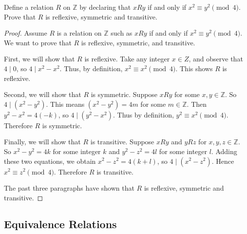 \documentclass[DIN, pagenumber=false, fontsize=11pt, parskip=half]{scrartcl}
\begin{document}
\begin{problems}
    \problem Define a relation $R$ on $\mathbb{Z}$ by declaring that $xRy$ if and only if $x^2 \equiv y^2 \pmod{4}$. Prove that $R$ is reflexive, symmetric and transitive.

    \answer 
    \begin{proof}
        Assume $R$ is a relation on $\mathbb{Z}$ such as $xRy$ if and only if $x^2 \equiv y^2 \pmod{4}$. We want to prove that $R$ is reflexive, symmetric, and transitive.

        First, we will show that $R$ is reflexive. Take any integer $x \in Z$, and observe that $4 \mid 0$, so $4 \mid x^2 - x^2$. Thus, by definition, $x^2 \equiv x^2 \pmod{4}$. This shows $R$ is reflexive.

        Second, we will show that $R$ is symmetric. Suppose $xRy$ for some $x,y \in \mathbb{Z}$. So $4 \mid (x^2 - y^2)$. This means $(x^2 - y^2) = 4m$ for some $m \in \mathbb{Z}$. Then $y^2 - x^2 = 4(-k)$, so $4 \mid (y^2-x^2)$. Thus by definition, $y^2 \equiv x^2 \pmod{4}$. Therefore $R$ is symmetric.

        Finally, we will show that $R$ is transitive. Suppose $xRy$ and $yRz$ for $x,y,z \in \mathbb{Z}$. So $x^2-y^2 = 4k$ for some integer $k$ and $y^2-z^2 = 4l$ for some integer $l$. Adding these two equations, we obtain $x^2-z^2 = 4(k+l)$, so $4 \mid (x^2-z^2)$. Hence $x^2 \equiv z^2 \pmod{4}$. Therefore $R$ is transitive.

        The past three paragraphs have shown that $R$ is reflexive, symmetric and transitive.
    \end{proof}

\end{problems}

\subsection{Equivalence Relations}
\end{document}
